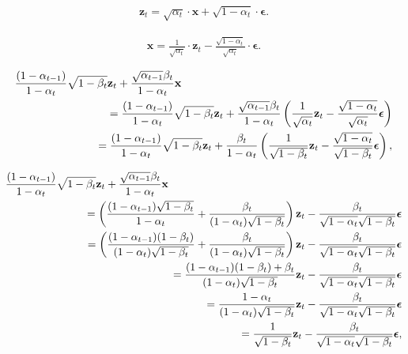 \documentclass[letterpaper,twoside,openany, titlepage,oldfontcommands,titles,dvipsnames]{memoir}
\begin{document}
\begin{eqnarray}\label{eq:diffusion_diff_kernel2}
  \mathbf{z}_{t} = \sqrt{\alpha_{t}}\cdot \mathbf{x} + \sqrt{1-\alpha_{t}}\cdot\boldsymbol\epsilon.
 \end{eqnarray}

\begin{eqnarray}\label{eq:diffusion_x_reparam}
  \mathbf{x} = \frac{1}{\sqrt{\alpha_{t}}}\cdot \mathbf{z}_t - \frac{\sqrt{1-\alpha_{t}}}{\sqrt{\alpha_{t}}}\cdot\boldsymbol\epsilon.
 \end{eqnarray}

\begin{eqnarray}
  \frac{(1-\alpha_{t-1})}{1-\alpha_{t}}\sqrt{1-\beta_{t}}\mathbf{z}_{t}+\frac{\sqrt{\alpha_{t-1}}\beta_{t}}{1-\alpha_{t}}\mathbf{x} \\
  &&\hspace{-3cm}
  =\frac{(1-\alpha_{t-1})}{1-\alpha_{t}}\sqrt{1-\beta_{t}}\mathbf{z}_{t}+\frac{\sqrt{\alpha_{t-1}}\beta_{t}}{1-\alpha_{t}}\left(\frac{1}{\sqrt{\alpha_{t}}} \mathbf{z}_t - \frac{\sqrt{1-\alpha_{t}}}{\sqrt{\alpha_{t}}}\boldsymbol\epsilon\right)\nonumber\\
 &&\hspace{-3cm}= \frac{(1-\alpha_{t-1})}{1-\alpha_{t}}\sqrt{1-\beta_{t}}\mathbf{z}_{t}+\frac{\beta_{t}}{1-\alpha_{t}}\left(\frac{1}{\sqrt{1-\beta_{t}}} \mathbf{z}_t - \frac{\sqrt{1-\alpha_{t}}}{\sqrt{1-\beta_{t}}}\boldsymbol\epsilon\right),\nonumber
 \end{eqnarray}

\begin{eqnarray}
  \frac{(1-\alpha_{t-1})}{1-\alpha_{t}}\sqrt{1-\beta_{t}}\mathbf{z}_{t}+\frac{\sqrt{\alpha_{t-1}}\beta_{t}}{1-\alpha_{t}}\mathbf{x}\\
  &&\hspace{-3cm}=\left(\frac{(1-\alpha_{t-1})\sqrt{1-\beta_{t}}}{1-\alpha_{t}}+\frac{\beta_{t}}{(1-\alpha_{t})\sqrt{1-\beta_{t}}}\right) \mathbf{z}_t - \frac{\beta_{t}}{\sqrt{1-\alpha_{t}}\sqrt{1-\beta_{t}}}\boldsymbol\epsilon\nonumber \\
  &&\hspace{-3cm}=\left(\frac{(1-\alpha_{t-1})(1-\beta_{t})}{(1-\alpha_{t})\sqrt{1-\beta_{t}}}+\frac{\beta_{t}}{(1-\alpha_{t})\sqrt{1-\beta_{t}}}\right) \mathbf{z}_t - \frac{\beta_{t}}{\sqrt{1-\alpha_{t}}\sqrt{1-\beta_{t}}}\boldsymbol\epsilon\nonumber \\
 &&\hspace{-3cm}=\frac{(1-\alpha_{t-1})(1-\beta_{t})+\beta_{t}}{(1-\alpha_{t})\sqrt{1-\beta_{t}}} \mathbf{z}_t - \frac{\beta_{t}}{\sqrt{1-\alpha_{t}}\sqrt{1-\beta_{t}}}\boldsymbol\epsilon\nonumber \\
 &&\hspace{-3cm}=\frac{1-\alpha_{t}}{(1-\alpha_{t})\sqrt{1-\beta_{t}}} \mathbf{z}_t - \frac{\beta_{t}}{\sqrt{1-\alpha_{t}}\sqrt{1-\beta_{t}}}\boldsymbol\epsilon\nonumber \\
 &&\hspace{-3cm}=\frac{1}{\sqrt{1-\beta_{t}}} \mathbf{z}_t - \frac{\beta_{t}}{\sqrt{1-\alpha_{t}}\sqrt{1-\beta_{t}}}\boldsymbol\epsilon,\nonumber 
 \end{eqnarray}
\end{document}
